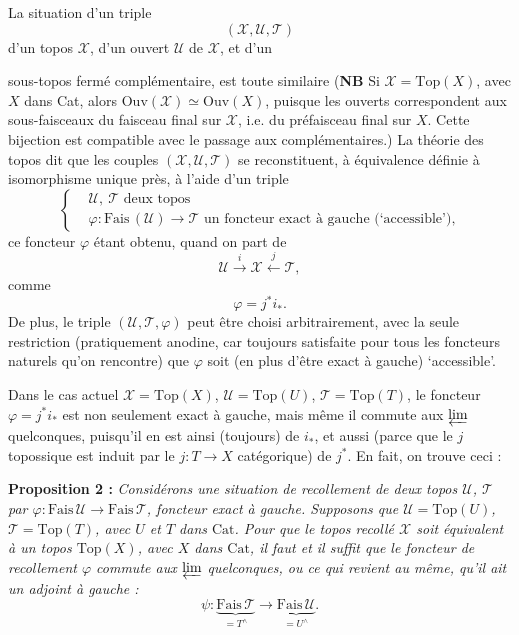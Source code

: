 \documentclass[11pt]{article}
\newcommand{\printedpage}[1]{\marginpar{\footnotesize p.~#1}}
\newcommand{\msp}[1]{\marginpar{\footnotesize [#1]}}
\begin{document}
La situation d'un triple
\[
(\mathcal{X},\mathcal{U},\mathcal{T})
\]
d'un topos $\mathcal{X}$, d'un ouvert $\mathcal{U}$ de $\mathcal{X}$, et d'un

\msp{page 62}

sous-topos fermé complémentaire, est toute similaire (\textbf{NB} Si $\mathcal{X} = \mathrm{Top}(X)$, avec $X$ dans Cat, alors $\mathrm{Ouv}(\mathcal{X}) \simeq \mathrm{Ouv}(X)$, puisque les ouverts correspondent aux sous-faisceaux du faisceau final sur $\mathcal{X}$, i.e. du préfaisceau final sur $X$. Cette bijection est compatible avec le passage aux complémentaires.) La théorie des topos dit que les couples $(\mathcal{X},\mathcal{U},\mathcal{T})$ se reconstituent, à équivalence définie à isomorphisme unique près, à l'aide d'un triple
\[
\left\{\begin{aligned}
&\mathcal{U},\ \mathcal{T} \text{ deux topos}\\[1ex]
&\varphi : \mathrm{Fais}\,(\mathcal{U}) \longrightarrow \mathcal{T} \text{ un foncteur exact à gauche (`accessible'),}
\end{aligned}\right.
\]
ce foncteur $\varphi$ étant obtenu, quand on part de
\[
\mathcal{U} \xrightarrow{\;i\;} \mathcal{X} \xleftarrow{\;j\;} \mathcal{T},
\]
comme
\[
\varphi = j^*i_*.
\]
De plus, le triple $(\mathcal{U},\mathcal{T},\varphi)$ peut être choisi arbitrairement, avec la seule restriction (pratiquement anodine, car toujours satisfaite pour tous les foncteurs naturels qu'on rencontre) que $\varphi$ soit (en plus d'être exact à gauche) `accessible'.

Dans le cas actuel $\mathcal{X} = \mathrm{Top}(X)$, $\mathcal{U} = \mathrm{Top}(U)$, $\mathcal{T} = \mathrm{Top}(T)$, le foncteur $\varphi = j^*i_*$ est non seulement exact à gauche, mais même il commute aux $\varprojlim$ quelconques, puisqu'il en est ainsi (toujours) de $i_*$, et aussi (parce que le $j$ topossique est induit par le $j : T \longrightarrow X$ catégorique) de $j^*$. En fait, on
\printedpage{46}
\msp{page 63}
trouve ceci :

\textbf{Proposition 2 :} \textit{Considérons une situation de recollement de deux topos $\mathcal{U}$, $\mathcal{T}$ par $\varphi : \mathrm{Fais}\,\mathcal{U} \longrightarrow \mathrm{Fais}\,\mathcal{T}$, foncteur exact à gauche. Supposons que $\mathcal{U} = \mathrm{Top}(U)$, $\mathcal{T} = \mathrm{Top}(T)$, avec $U$ et $T$ dans $\mathrm{Cat}$. Pour que le topos recollé $\mathcal{X}$ soit équivalent à un topos $\mathrm{Top}(X)$, avec $X$ dans $\mathrm{Cat}$, il faut et il suffit que le foncteur de recollement $\varphi$ commute aux $\varprojlim$ quelconques, ou ce qui revient au même, qu'il ait un adjoint à gauche :}
\[
\psi : \underbrace{\mathrm{Fais}\,\mathcal{T}}_{= T^\wedge} \longrightarrow \underbrace{\mathrm{Fais}\,\mathcal{U}}_{= U^\wedge}.
\]
\end{document}
